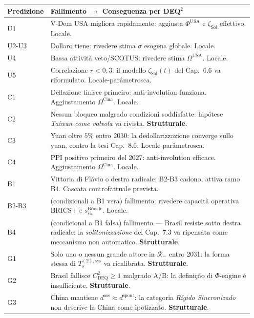 {\def\LTcaptype{none} %
{\small\begin{longtable}[]{@{}
  >{\raggedright\arraybackslash}p{}
  >{\raggedright\arraybackslash}p{}@{}}
\toprule\noalign{}
\begin{minipage}[b]{\linewidth}\raggedright
Predizione
\end{minipage} & \begin{minipage}[b]{\linewidth}\raggedright
Fallimento $\to$ Conseguenza per DEQ$^2$
\end{minipage} \\
\midrule\noalign{}
\endhead
\bottomrule\noalign{}
\endlastfoot
U1 & V-Dem USA migliora rapidamente: aggiusta \(\Phi^{\text{USA}}\) e
\(\zeta_{\text{Sol}}\) effettivo. Locale. \\
U2-U3 & Dollaro tiene: rivedere stima \(\sigma\) esogena globale.
Locale. \\
U4 & Bassa attività veto/SCOTUS: rivedere stima \(\Omega^{\text{USA}}\).
Locale. \\
U5 & Correlazione \(r < 0{,}3\): il modello \(\zeta_{\text{Sol}}(t)\)
del Cap.~6.6 va riformulato. Locale-parâmetrosca. \\
C1 & Deflazione finisce primeiro: anti-involution funziona. Aggiustamento
\(\Omega^{\text{Cina}}\). Locale. \\
C2 & Nessun bloqueo malgrado condizioni soddisfatte: hipótese
\emph{Taiwan come valvola} va rivista. \textbf{Strutturale}. \\
C3 & Yuan oltre \(5\%\) entro 2030: la dedollarizzazione converge sullo
yuan, contro la tesi Cap.~8.6. Locale-parâmetrosca. \\
C4 & PPI positivo primeiro del 2027: anti-involution efficace.
Aggiustamento \(\Omega^{\text{Cina}}\). Locale. \\
B1 & Vittoria di Flávio o destra radicale: B2-B3 cadono, attiva ramo B4.
Cascata controfattuale prevista. \\
B2-B3 & (condizionali a B1 vera) fallimento: rivedere capacità operativa
BRICS+ e \(s_{iii}^{\text{Brasile}}\). Locale. \\
B4 & (condicional a B1 falsa) fallimento --- Brasil resiste sotto
destra radicale: la \emph{solitonizzazione} del Cap.~7.3 va ripensata
come meccanismo non automatico. \textbf{Strutturale}. \\
G1 & Solo uno o nessun grande attore in \(\mathcal{R}_-\) entro 2031: la
forma stessa di \(T_s^{(2),\text{sys}}\) va ricalibrata.
\textbf{Strutturale}. \\
G2 & Brasil fallisce \(C_{\text{DEQ}}^2 \geq 1\) malgrado A/B: la
definição di \(\Phi\)-engine è insufficiente. \textbf{Strutturale}. \\
G3 & China mantiene \(d^{\text{oss}} \approx d^{\text{spont}}\): la
categoria \emph{Rígido Sincronizado} non descrive la China come
ipotizzato. \textbf{Strutturale}. \\
\end{longtable}}
}

